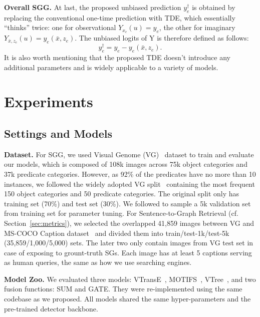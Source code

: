 \documentclass[10pt,twocolumn,letterpaper]{article}
\begin{document}
\noindent\textbf{Overall SGG.} At last, the proposed unbiased prediction $y^{\dagger}_{e}$ is obtained by replacing the conventional one-time prediction with TDE, which essentially ``thinks'' twice: one for observational $Y_{x_{e}}(u)=y_{e}$, the other for imaginary $Y_{\bar{x},z_e}(u) = y_{e}(\bar{x}, z_{e})$. The unbiased logits of Y is therefore defined as follows:
\begin{equation}
    y^{\dagger}_{e} = y_{e} - y_{e}(\bar{x}, z_{e}).
\end{equation}
It is also worth mentioning that the proposed TDE doesn't introduce any additional parameters and is widely applicable to a variety of models. 
\section{Experiments}
\label{sec:exp}
\vspace{-0.05in}
\subsection{Settings and Models}
\vspace{-0.05in}
\noindent\textbf{Dataset.} For SGG, we used Visual Genome (VG)~\cite{krishna2017visual} dataset to train and evaluate our models, which is composed of 108k images across 75k object categories and 37k predicate categories. However, as 92\% of the predicates have no more than 10 instances, we followed the widely adopted VG split~\cite{xu2017scene, zellers2018neural, tang2019learning, chen2019counterfactual} containing the most frequent 150 object categories and 50 predicate categories. The original split only has training set (70\%) and test set (30\%). We followed \cite{zellers2018neural} to sample a 5k validation set from training set for parameter tuning. For Sentence-to-Graph Retrieval (cf. Section~\ref{sec:metrics}), we selected the overlapped 41,859 images between VG and MS-COCO Caption dataset~\cite{lin2014microsoft} and divided them into train/test-1k/test-5k (35,859/1,000/5,000) sets. The later two only contain images from VG test set in case of exposing to grount-truth SGs. Each image has at least 5 captions serving as human queries, the same as how we use searching engines.

\noindent\textbf{Model Zoo.} We evaluated three models: VTransE~\cite{zhang2017visual}, MOTIFS~\cite{zellers2018neural}, VTree~\cite{tang2019learning}, and two fusion functions: SUM and GATE. They were re-implemented using the same codebase as we proposed. All models shared the same hyper-parameters and the pre-trained detector backbone.
\end{document}
